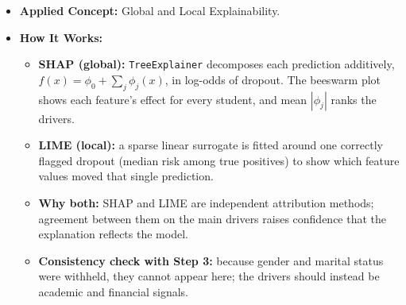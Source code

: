 \documentclass[11pt]{article}
\providecommand{\tightlist}{%
      \setlength{\itemsep}{0pt}\setlength{\parskip}{0pt}}
\begin{document}
\begin{itemize}
\tightlist
\item
  \textbf{Applied Concept:} Global and Local Explainability.
\item
  \textbf{How It Works:}

  \begin{itemize}
  \tightlist
  \item
    \textbf{SHAP (global):} \texttt{TreeExplainer} decomposes each
    prediction additively, \(f(x) = \phi_0 + \sum_j \phi_j(x)\), in
    log-odds of dropout. The beeswarm plot shows each feature's effect
    for every student, and mean \(|\phi_j|\) ranks the drivers.
  \item
    \textbf{LIME (local):} a sparse linear surrogate is fitted around
    one correctly flagged dropout (median risk among true positives) to
    show which feature values moved that single prediction.
  \item
    \textbf{Why both:} SHAP and LIME are independent attribution
    methods; agreement between them on the main drivers raises
    confidence that the explanation reflects the model.
  \item
    \textbf{Consistency check with Step 3:} because gender and marital
    status were withheld, they cannot appear here; the drivers should
    instead be academic and financial signals.
  \end{itemize}
\end{itemize}
\end{document}
